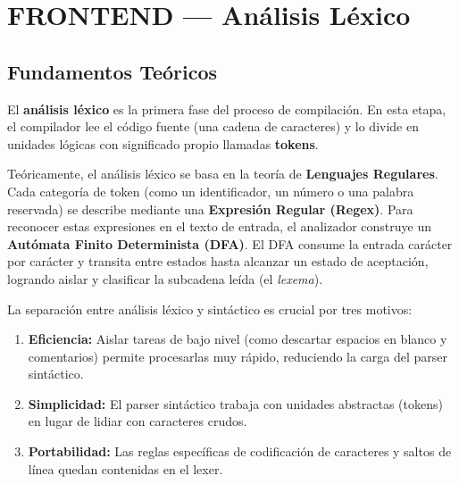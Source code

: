 \chapter{FRONTEND — Análisis Léxico}

\section{Fundamentos Teóricos}

El \textbf{análisis léxico} es la primera fase del proceso de compilación. En esta etapa, el compilador lee el código fuente (una cadena de caracteres) y lo divide en unidades lógicas con significado propio llamadas \textbf{tokens}. 

Teóricamente, el análisis léxico se basa en la teoría de \textbf{Lenguajes Regulares}. Cada categoría de token (como un identificador, un número o una palabra reservada) se describe mediante una \textbf{Expresión Regular (Regex)}. Para reconocer estas expresiones en el texto de entrada, el analizador construye un \textbf{Autómata Finito Determinista (DFA)}. El DFA consume la entrada carácter por carácter y transita entre estados hasta alcanzar un estado de aceptación, logrando aislar y clasificar la subcadena leída (el \textit{lexema}).

\begin{infobox}
La separación entre análisis léxico y sintáctico es crucial por tres motivos:
\begin{enumerate}
    \item \textbf{Eficiencia:} Aislar tareas de bajo nivel (como descartar espacios en blanco y comentarios) permite procesarlas muy rápido, reduciendo la carga del parser sintáctico.
    \item \textbf{Simplicidad:} El parser sintáctico trabaja con unidades abstractas (tokens) en lugar de lidiar con caracteres crudos.
    \item \textbf{Portabilidad:} Las reglas específicas de codificación de caracteres y saltos de línea quedan contenidas en el lexer.
\end{enumerate}
\end{infobox}

